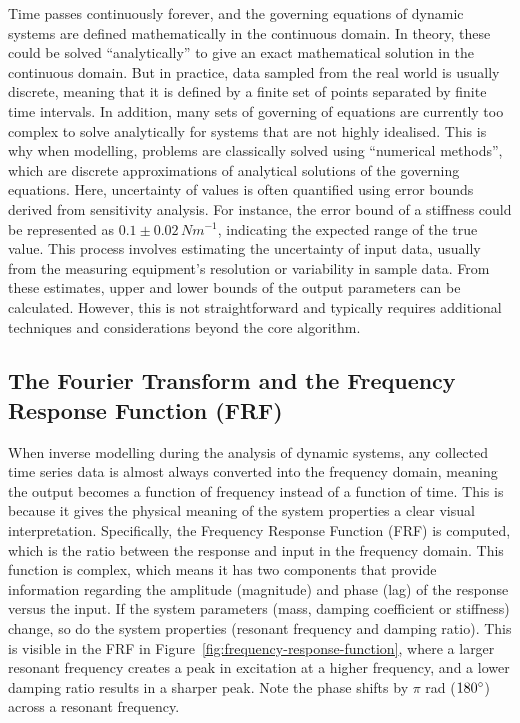 \documentclass[12pt]{article}
\begin{document}
    Time passes continuously forever, and the governing equations of dynamic systems are defined mathematically in the continuous domain.
    In theory, these could be solved ``analytically'' to give an exact mathematical solution in the continuous domain.
    But in practice, data sampled from the real world is usually discrete, meaning that it is defined by a finite set of points separated by finite time intervals.
    In addition, many sets of governing of equations are currently too complex to solve analytically for systems that are not highly idealised.
    This is why when modelling, problems are classically solved using ``numerical methods'', which are discrete approximations of analytical solutions of the governing equations.
    Here, uncertainty of values is often quantified using error bounds derived from sensitivity analysis.
    For instance, the error bound of a stiffness could be represented as $0.1 \pm 0.02 \, Nm^{-1}$, indicating the expected range of the true value.
    This process involves estimating the uncertainty of input data, usually from the measuring equipment's resolution or variability in sample data.
    From these estimates, upper and lower bounds of the output parameters can be calculated.
    However, this is not straightforward and typically requires additional techniques and considerations beyond the core algorithm.


    \subsection{The Fourier Transform and the Frequency Response Function (FRF)}

    When inverse modelling during the analysis of dynamic systems, any collected time series data is almost always converted into the frequency domain, meaning the output becomes a function of frequency instead of a function of time.
    This is because it gives the physical meaning of the system properties a clear visual interpretation.
    Specifically, the Frequency Response Function (FRF) is computed, which is the ratio between the response and input in the frequency domain.
    This function is complex, which means it has two components that provide information regarding the amplitude (magnitude) and phase (lag) of the response versus the input.
    If the system parameters (mass, damping coefficient or stiffness) change, so do the system properties (resonant frequency and damping ratio).
    This is visible in the FRF in Figure~\ref{fig:frequency-response-function}, where a larger resonant frequency creates a peak in excitation at a higher frequency, and a lower damping ratio results in a sharper peak.
    Note the phase shifts by $\pi$ rad ($180\degree$) across a resonant frequency.
\end{document}
